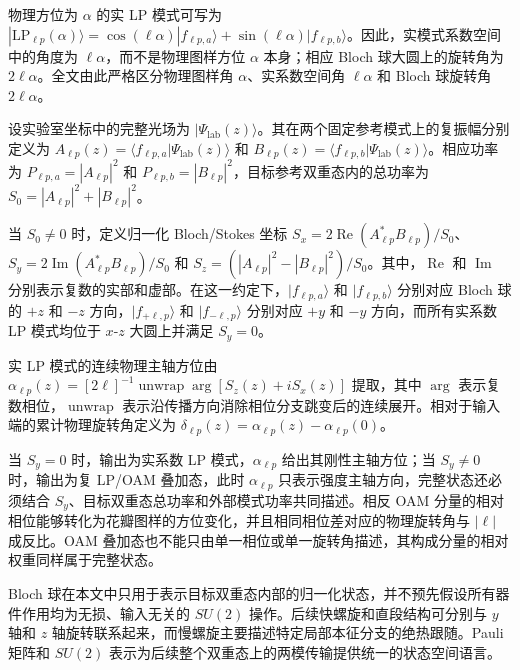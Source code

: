 \documentclass[
  UTF8,
  zihao=-4,
  fontset=fandol]{ctexart}
\begin{document}
物理方位为 \(\alpha\) 的实 LP 模式可写为
\(|\mathrm{LP}_{\ell p}(\alpha)\rangle=\cos(\ell\alpha)|f_{\ell p,a}\rangle+\sin(\ell\alpha)|f_{\ell p,b}\rangle\)。因此，实模式系数空间中的角度为
\(\ell\alpha\)，而不是物理图样方位 \(\alpha\) 本身；相应 Bloch
球大圆上的旋转角为 \(2\ell\alpha\)。全文由此严格区分物理图样角
\(\alpha\)、实系数空间角 \(\ell\alpha\) 和 Bloch 球旋转角
\(2\ell\alpha\)。

设实验室坐标中的完整光场为
\(|\Psi_{\mathrm{lab}}(z)\rangle\)。其在两个固定参考模式上的复振幅分别定义为
\(A_{\ell p}(z)=\langle f_{\ell p,a}|\Psi_{\mathrm{lab}}(z)\rangle\) 和
\(B_{\ell p}(z)=\langle f_{\ell p,b}|\Psi_{\mathrm{lab}}(z)\rangle\)。相应功率为
\(P_{\ell p,a}=|A_{\ell p}|^2\) 和
\(P_{\ell p,b}=|B_{\ell p}|^2\)，目标参考双重态内的总功率为
\(S_0=|A_{\ell p}|^2+|B_{\ell p}|^2\)。

当 \(S_0\neq0\) 时，定义归一化 Bloch/Stokes 坐标
\(S_x=2\operatorname{Re}(A_{\ell p}^{*}B_{\ell p})/S_0\)、\(S_y=2\operatorname{Im}(A_{\ell p}^{*}B_{\ell p})/S_0\)
和
\(S_z=(|A_{\ell p}|^2-|B_{\ell p}|^2)/S_0\)。其中，\(\operatorname{Re}\)
和 \(\operatorname{Im}\)
分别表示复数的实部和虚部。在这一约定下，\(|f_{\ell p,a}\rangle\) 和
\(|f_{\ell p,b}\rangle\) 分别对应 Bloch 球的 \(+z\) 和 \(-z\)
方向，\(|f_{+\ell,p}\rangle\) 和 \(|f_{-\ell,p}\rangle\) 分别对应 \(+y\)
和 \(-y\) 方向，而所有实系数 LP 模式均位于 \(x\)-\(z\) 大圆上并满足
\(S_y=0\)。

实 LP 模式的连续物理主轴方位由
\(\alpha_{\ell p}(z)=[2\ell]^{-1}\operatorname{unwrap}\arg[S_z(z)+iS_x(z)]\)
提取，其中 \(\arg\) 表示复数相位，\(\operatorname{unwrap}\)
表示沿传播方向消除相位分支跳变后的连续展开。相对于输入端的累计物理旋转角定义为
\(\delta_{\ell p}(z)=\alpha_{\ell p}(z)-\alpha_{\ell p}(0)\)。

当 \(S_y=0\) 时，输出为实系数 LP 模式，\(\alpha_{\ell p}\)
给出其刚性主轴方位；当 \(S_y\neq0\) 时，输出为复 LP/OAM 叠加态，此时
\(\alpha_{\ell p}\) 只表示强度主轴方向，完整状态还必须结合
\(S_y\)、目标双重态总功率和外部模式功率共同描述。相反 OAM
分量的相对相位能够转化为花瓣图样的方位变化，并且相同相位差对应的物理旋转角与
\(|\ell|\) 成反比。OAM
叠加态也不能只由单一相位或单一旋转角描述，其构成分量的相对权重同样属于完整状态。

Bloch
球在本文中只用于表示目标双重态内部的归一化状态，并不预先假设所有器件作用均为无损、输入无关的
\(SU(2)\) 操作。后续快螺旋和直段结构可分别与 \(y\) 轴和 \(z\)
轴旋转联系起来，而慢螺旋主要描述特定局部本征分支的绝热跟随。Pauli 矩阵和
\(SU(2)\) 表示为后续整个双重态上的两模传输提供统一的状态空间语言。
\end{document}
